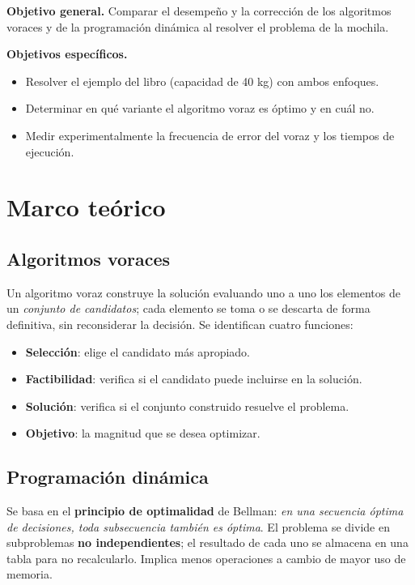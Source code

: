 \documentclass[12pt,a4paper]{article}
\begin{document}
\textbf{Objetivo general.} Comparar el desempeño y la corrección de los algoritmos voraces y de la programación dinámica al resolver el problema de la mochila.

\textbf{Objetivos específicos.}
\begin{itemize}[nosep]
  \item Resolver el ejemplo del libro (capacidad de 40 kg) con ambos enfoques.
  \item Determinar en qué variante el algoritmo voraz es óptimo y en cuál no.
  \item Medir experimentalmente la frecuencia de error del voraz y los tiempos de ejecución.
\end{itemize}

\section{Marco teórico}

\subsection{Algoritmos voraces}
Un algoritmo voraz construye la solución evaluando uno a uno los elementos de un \emph{conjunto de candidatos}; cada elemento se toma o se descarta de forma definitiva, sin reconsiderar la decisión. Se identifican cuatro funciones:
\begin{itemize}[nosep]
  \item \textbf{Selección}: elige el candidato más apropiado.
  \item \textbf{Factibilidad}: verifica si el candidato puede incluirse en la solución.
  \item \textbf{Solución}: verifica si el conjunto construido resuelve el problema.
  \item \textbf{Objetivo}: la magnitud que se desea optimizar.
\end{itemize}

\subsection{Programación dinámica}
Se basa en el \textbf{principio de optimalidad} de Bellman: \emph{en una secuencia óptima de decisiones, toda subsecuencia también es óptima}. El problema se divide en subproblemas \textbf{no independientes}; el resultado de cada uno se almacena en una tabla para no recalcularlo. Implica menos operaciones a cambio de mayor uso de memoria.
\end{document}
